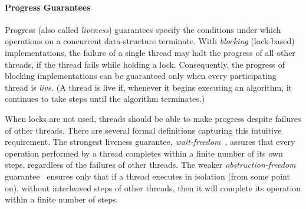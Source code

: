 

\paragraph{Progress Guarantees}
Progress (also called \emph{liveness}) guarantees specify the conditions under which operations on a concurrent data-structure terminate. With \emph{blocking} (lock-based) implementations, the failure of a single thread may halt the progress of all other threads, if the thread fails while holding a lock. Consequently, the progress of blocking implementations can be guaranteed only when every participating thread is \emph{live}. (A thread is live if, whenever it begins executing an algorithm, it continues to take steps until the algorithm terminates.)

When locks are not used, threads should be able to make progress despite failures of other threads.
There are several formal definitions capturing this intuitive requirement.
The strongest liveness guarantee, \emph{wait-freedom}~\cite{herlihy91waitfree},
assures that every operation performed by a thread completes within
a finite number of its own steps, regardless of the failures of other threads.
%
The weaker \emph{obstruction-freedom} guarantee~\cite{AttiyaGHK09,HerlihyLMS03, DBLP:conf/icdcs/HerlihyLM03}
ensures only that if a thread executes in isolation (from some point on),
without interleaved steps of other threads,
then it will complete its operation within a finite number of steps.
